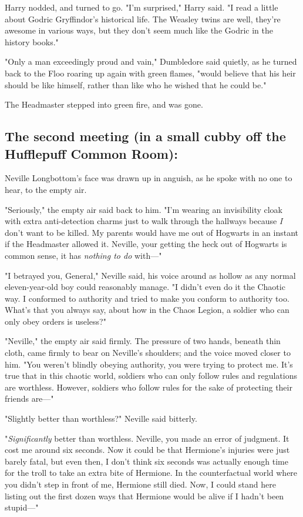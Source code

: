 Harry nodded, and turned to go. "I'm surprised," Harry said. "I read a little
about Godric Gryffindor's historical life. The Weasley twins are{\el} well,
they're awesome in various ways, but they don't seem much like the Godric in
the history books."

"Only a man exceedingly proud and vain," Dumbledore said quietly, as he turned
back to the Floo roaring up again with green flames, "would believe that his
heir should be like himself, rather than like who he wished that he could be."

The Headmaster stepped into green fire, and was gone.
\sbreak
\subsection{The second meeting (in a small cubby off the Hufflepuff Common Room):}

Neville Longbottom's face was drawn up in anguish, as he spoke with no one to
hear, to the empty air.

"Seriously," the empty air said back to him. "I'm wearing an invisibility cloak
with extra anti-detection charms just to walk through the hallways because
\emph{I} don't want to be killed. My parents would have me out of Hogwarts in
an instant if the Headmaster allowed it. Neville, your getting the heck out of
Hogwarts is common sense, it has \emph{nothing to do} with\mbox{---}"

"I betrayed you, General," Neville said, his voice around as hollow as any
normal eleven-year-old boy could reasonably manage. "I didn't even do it the
Chaotic way. I conformed to authority and tried to make you conform to
authority too. What's that you always say, about how in the Chaos Legion, a
soldier who can only obey orders is useless?"

"Neville," the empty air said firmly. The pressure of two hands, beneath thin
cloth, came firmly to bear on Neville's shoulders; and the voice moved closer
to him. "You weren't blindly obeying authority, you were trying to protect me.
It's true that in this chaotic world, soldiers who can only follow rules and
regulations are worthless. However, soldiers who follow rules for the sake of
protecting their friends are\mbox{---}"

"Slightly better than worthless?" Neville said bitterly.

"\emph{Significantly} better than worthless. Neville, you made an error of
judgment. It cost me around six seconds. Now it could be that Hermione's
injuries were just barely fatal, but even then, I don't think six seconds was
actually enough time for the troll to take an extra bite of Hermione. In the
counterfactual world where you didn't step in front of me, Hermione still died.
Now, I could stand here listing out the first dozen ways that Hermione would be
alive if I hadn't been stupid\mbox{---}"

